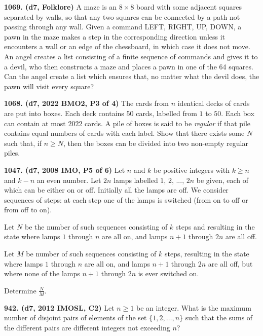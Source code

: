 \documentclass{article}
\begin{document}
\textbf{1069. (\color{red}d7\color{black}, Folklore)} A maze is an \(8 \times 8\) board with some adjacent squares separated by walls, so that any two squares can be connected by a path not passing through any wall.  Given a command LEFT, RIGHT, UP, DOWN, a pawn in the maze makes a step in the corresponding direction unless it encounters a wall or an edge of the chessboard, in which case it does not move.\\[12pt]

An angel creates a list consisting of a finite sequence of commands and gives it to a devil, who then constructs a maze and places a pawn in one of the 64 squares.  Can the angel create a list which ensures that, no matter what the devil does, the pawn will visit every square?

\textbf{1068. (\color{red}d7\color{black}, 2022 BMO2, P3 of 4)} The cards from $n$ identical decks of cards are put into boxes. Each deck contains $50$ cards, labelled from $1$ to $50$. Each box can contain at most $2022$ cards. A pile of boxes is said to be \textit{regular} if that pile contains equal numbers of cards with each label. Show that there exists some $N$ such that, if $n\ge N$, then the boxes can be divided into two non-empty regular piles.

\textbf{1047. (\color{red}d7\color{black}, 2008 IMO, P5 of 6)} Let $ n$ and $ k$ be positive integers with $ k \geq n$ and $ k - n$ an even number. Let $ 2n$ lamps labelled $ 1$, $ 2$, ..., $ 2n$ be given, each of which can be either on or off. Initially all the lamps are off. We consider sequences of steps: at each step one of the lamps is switched (from on to off or from off to on).

Let $ N$ be the number of such sequences consisting of $ k$ steps and resulting in the state where lamps $ 1$ through $ n$ are all on, and lamps $ n + 1$ through $ 2n$ are all off.

Let $ M$ be number of such sequences consisting of $ k$ steps, resulting in the state where lamps $ 1$ through $ n$ are all on, and lamps $ n + 1$ through $ 2n$ are all off, but where none of the lamps $ n + 1$ through $ 2n$ is ever switched on.

Determine $ \frac {N}{M}$.

\textbf{942. (\color{red}d7\color{black}, 2012 IMOSL, C2)} Let $n \geq 1$ be an integer. What is the maximum number of disjoint pairs of elements of the set $\{ 1,2,\ldots , n \}$ such that the sums of the different pairs are different integers not exceeding $n$?
\end{document}
